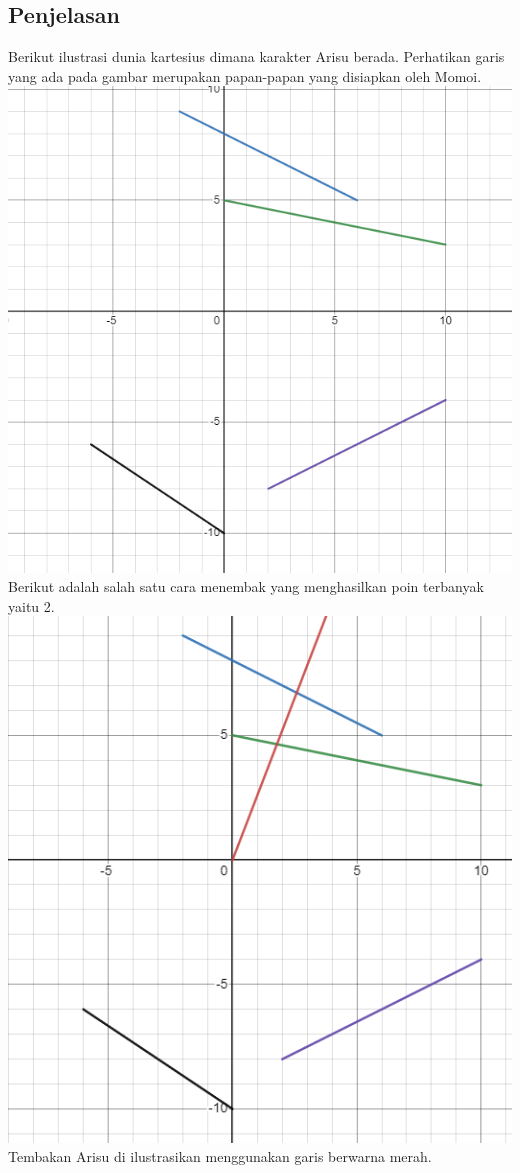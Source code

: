 \documentclass{article}
\begin{document}
\subsection*{Penjelasan}
Berikut ilustrasi dunia kartesius dimana karakter Arisu berada. Perhatikan garis yang ada pada gambar merupakan papan-papan yang disiapkan oleh Momoi.\\
\includegraphics[scale=0.7]{desmos1}\\
Berikut adalah salah satu cara menembak yang menghasilkan poin terbanyak yaitu 2.\\
\includegraphics[scale=0.8]{desmos2}\\
Tembakan Arisu di ilustrasikan menggunakan garis berwarna merah.
\end{document}
